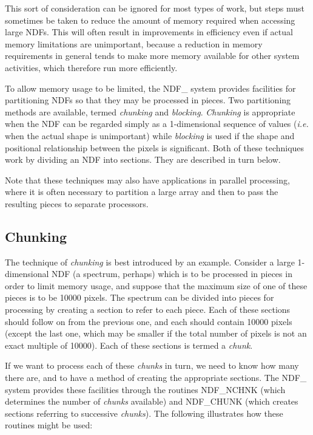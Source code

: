 \documentclass[twoside,11pt]{article}
\newcommand{\htmlref}[2]{#1}
\newcommand{\xlabel}[1]{}
\newcommand{\st}[1]{{\em{#1}}}
\begin{document}
This sort of consideration can be ignored for most types of work, but
steps must sometimes be taken to reduce the amount of memory required
when accessing large NDFs. This will often result in improvements in
efficiency even if actual memory limitations are unimportant, because a
reduction in memory requirements in general tends to make more memory
available for other system activities, which therefore run more
efficiently.

To allow memory usage to be limited, the NDF\_ system provides
facilities for partitioning NDFs so that they may be processed in
pieces. Two partitioning methods are available, termed \st{chunking\/}
and \st{blocking}. \st{Chunking\/} is appropriate when the NDF can be
regarded simply as a 1-dimensional sequence of values (\st{i.e.\/} when
the actual shape is unimportant) while \st{blocking\/} is used if the
shape and positional relationship between the pixels is significant.
Both of these techniques work by dividing an NDF into sections. They
are described in turn below.

Note that these techniques may also have applications in parallel
processing, where it is often necessary to partition a large array and
then to pass the resulting pieces to separate processors.

\subsection{\xlabel{chunking}Chunking}

The technique of \st{chunking\/} is best introduced by an example.
Consider a large \mbox{1-dimensional} NDF (a spectrum, perhaps) which is
to be processed in pieces in order to limit memory usage, and suppose
that the maximum size of one of these pieces is to be 10000 pixels. The
spectrum can be divided into pieces for processing by creating a section
to refer to each piece. Each of these sections should follow on from the
previous one, and each should contain 10000 pixels (except the last one,
which may be smaller if the total number of pixels is not an exact
multiple of 10000). Each of these sections is termed a \st{chunk}.

If we want to process each of these \st{chunks\/} in turn, we need to
know how many there are, and to have a method of creating the
appropriate sections. The NDF\_ system provides these facilities through
the routines \htmlref{NDF\_NCHNK}{NDF_NCHNK} (which determines the number of \st{chunks\/}
available) and \htmlref{NDF\_CHUNK}{NDF_CHUNK} (which creates sections referring to
successive \st{chunks\/}). The following illustrates how these routines
might be used:
\end{document}
